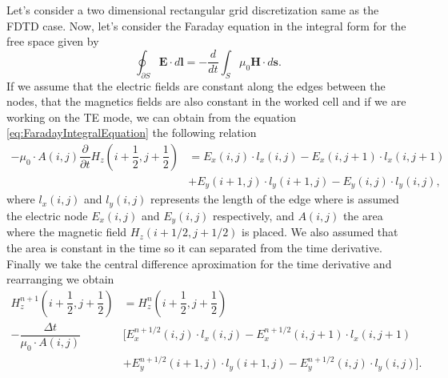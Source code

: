 \documentclass[12pt, oneside]{book}
\begin{document}
Let's consider a two dimensional rectangular grid discretization same as the FDTD case. Now, let's consider the Faraday equation in the integral form for the free space given by
\begin{equation}
    \oint_{\partial S} \boldsymbol{E} \cdot d \boldsymbol{l} = -\dfrac{d}{dt} \int_{S} \mu_0 \boldsymbol{H} \cdot d\boldsymbol{s}.
    \label{eq:FaradayIntegralEquation}
\end{equation}
If we assume that the electric fields are constant along the edges between the nodes, that the magnetics fields are also constant in the worked cell and if we are working on the TE mode, we can obtain from the equation \ref{eq:FaradayIntegralEquation} the following relation
\begin{equation}
\begin{aligned}
    -\mu_0 \cdot A(i,j)\dfrac{\partial}{\partial t} H_z\left( i + \dfrac{1}{2}, j + \dfrac{1}{2} \right) &= E_x(i,j)\cdot l_x(i,j) - E_x(i,j+1) \cdot l_x(i,j+1) \\
                                                                                                   &+ E_y(i+1,j)\cdot l_y(i+1,j) - E_y(i,j)\cdot l_y(i,j),  
\end{aligned}
\label{eq:FaradayIntegralEquationRectangularGrid}
\end{equation}
where $l_x(i,j)$ and $l_y(i,j)$ represents the length of the edge where is assumed the electric node $E_x(i,j)$ and $E_y(i,j)$ respectively, and $A(i,j)$ the area where the magnetic field $H_z (i + 1/2, j + 1/2)$ is placed. We also assumed that the area is constant in the time so it can separated from the time derivative. Finally we take the central difference aproximation for the time derivative and rearranging we obtain
\begin{equation}
    \begin{aligned}
        H_z^{n + 1}\left( i + \dfrac{1}{2}, j + \dfrac{1}{2} \right) &= H_z^{n}\left( i + \dfrac{1}{2}, j + \dfrac{1}{2} \right)  \\
        - \dfrac{\Delta t}{\mu_0 \cdot A(i,j)} & \big[ E^{n + 1/2}_x(i,j)\cdot l_x(i,j)- E^{n + 1/2}_x(i,j+1)\cdot l_x(i,j+1)  \\
                                                                       &+  E^{n + 1/2}_y(i+1,j)\cdot l_y(i+1,j) - E^{n + 1/2}_y(i,j)\cdot l_y(i,j)\big].  
    \end{aligned}
\label{eq:FaradayIntegralEquationRectangularGrid}
\end{equation}
\end{document}
